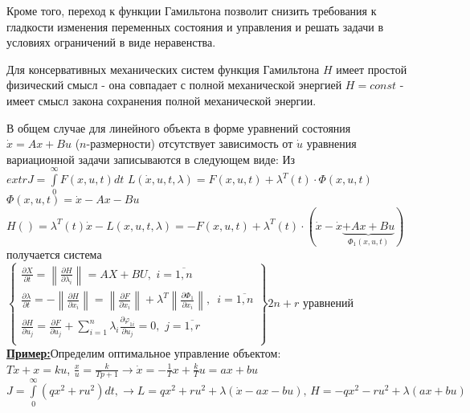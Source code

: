 \documentclass[preprint,russian,a5paper,10pt,twoside,mediummath]{ncc}
\newcommand{\ExampleMy}{\vspace{\baselineskip}\textbf{\underline{Пример:}}}
\begin{document}
\par Кроме того, переход к функции Гамильтона позволит снизить требования к гладкости изменения переменных состояния и управления и решать задачи в условиях ограничений в виде неравенства.
\par Для консервативных механических систем функция Гамильтона $H$ имеет простой физический смысл - она совпадает с полной механической энергией $H=const$ - имеет смысл закона сохранения полной механической энергии.
\par В общем случае для линейного объекта в форме уравнений состояния $\dot{x}=Ax+Bu$ ($n$-размерности) отсутствует зависимость от $\dot{u}$ уравнения вариационной задачи записываются в следующем виде:
Из $extrJ=\int\limits_{0}^{\infty }{F\left( x,u,t \right)dt}$
$L\left( \dot{x},u,t,\lambda  \right)=F\left( x,u,t \right)+{{\lambda }^{T}}\left( t \right)\cdot \Phi \left( x,u,t \right)$ $\Phi \left( x,u,t \right)=\dot{x}-Ax-Bu$
\\$H\left( {} \right)={{\lambda }^{T}}\left( t \right)\dot{x}-L\left( x,u,t,\lambda  \right)=-F\left( x,u,t \right)+{{\lambda }^{T}}\left( t \right)\cdot \left( \dot{x}-\dot{x}\underbrace{+Ax+Bu}_{{{\Phi }_{1}}\left( x,u,t \right)} \right)$
получается система 
\\$\left\{ \left. \begin{array}{*{35}{l}}
   \frac{\partial X}{\partial t}=\left\| \frac{\partial H}{\partial {{\lambda }_{i}}} \right\|=AX+BU,\,\,i=\overline{1,n}  \\
   \frac{\partial \lambda }{\partial t}=-\left\| \frac{\partial H}{\partial {{x}_{i}}} \right\|=\left\| \frac{\partial F}{\partial {{x}_{i}}} \right\|+{{\lambda }^{T}}\left\| \frac{\partial {{\Phi }_{1}}}{\partial {{x}_{i}}} \right\|,\,\,\,i=\overline{1,n}  \\
   \frac{\partial H}{\partial {{u}_{j}}}=\frac{\partial F}{\partial {{u}_{j}}}+\sum\limits_{i=1}^{n}{{{\lambda }_{i}}\frac{\partial {{\varphi }_{1i}}}{\partial {{u}_{j}}}}=0,\,\,j=\overline{1,r}  \\
\end{array} \right\} \right.2n+r$ уравнений
\\
\ExampleMy Определим оптимальное управление объектом:
\\$T\dot{x}+x=ku$, $\frac{x}{u}=\frac{k}{Tp+1}\to \dot{x}=-\frac{1}{T}x+\frac{k}{T}u=ax+bu$
\\$J=\int\limits_{0}^{\infty }{\left( q{{x}^{2}}+r{{u}^{2}} \right)}dt,\to L=q{{x}^{2}}+r{{u}^{2}}+\lambda \left( \dot{x}-ax-bu \right),\,H=-q{{x}^{2}}-r{{u}^{2}}+\lambda \left( ax+bu \right)$
\end{document}
